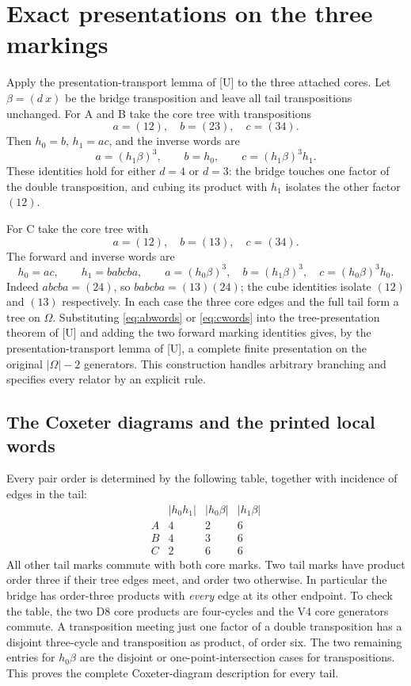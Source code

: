 \section{Exact presentations on the three markings}
Apply the presentation-transport lemma of [U] to the three attached cores. Let $\beta=(d\ x)$ be the
bridge transposition and leave all tail transpositions unchanged.
For A and B take the core tree with transpositions
\[
 a=(12),\quad b=(23),\quad c=(34).
\]
Then $h_0=b$, $h_1=ac$, and the inverse words are
\begin{equation}\label{eq:abwords}
 a=(h_1\beta)^3,\qquad b=h_0,\qquad c=(h_1\beta)^3h_1.
                                                               \end{equation}
These identities hold for either $d=4$ or $d=3$: the bridge touches
one factor of the double transposition, and cubing its product with
$h_1$ isolates the other factor $(12)$.

For C take the core tree with
\[
 a=(12),\quad b=(13),\quad c=(34).
\]
The forward and inverse words are
\begin{equation}\label{eq:cwords}
 h_0=ac,\qquad h_1=babcba,\qquad
 a=(h_0\beta)^3,\quad b=(h_1\beta)^3,\quad c=(h_0\beta)^3h_0.
                                                               \end{equation}
Indeed $abcba=(24)$, so $babcba=(13)(24)$; the cube identities
isolate $(12)$ and $(13)$ respectively.
In each case the three core edges and the full tail form a tree on
$\Omega$. Substituting \eqref{eq:abwords} or \eqref{eq:cwords} into the tree-presentation theorem of [U] and
adding the two forward marking identities gives, by
the presentation-transport lemma of [U], a complete finite presentation on the
original $|\Omega|-2$ generators. This construction handles arbitrary
branching and specifies every relator by an explicit rule.

\subsection{The Coxeter diagrams and the printed local words}
Every pair order is determined by the following table, together with
incidence of edges in the tail:
\[
\begin{array}{c|ccc}
 &|h_0h_1|&|h_0\beta|&|h_1\beta|\\\hline
 A&4&2&6\\ B&4&3&6\\ C&2&6&6
\end{array}
\]
All other tail marks commute with both core marks. Two tail marks
have product order three if their tree edges meet, and order two
otherwise. In particular the bridge has order-three products with
\emph{every} edge at its other endpoint. To check the table, the two
D8 core products are four-cycles and the V4 core generators commute.
A transposition meeting just one factor of a double transposition
has a disjoint three-cycle and transposition as product, of order six.
The two remaining entries for $h_0\beta$ are the disjoint or
one-point-intersection cases for transpositions. This proves the
complete Coxeter-diagram description for every tail.

